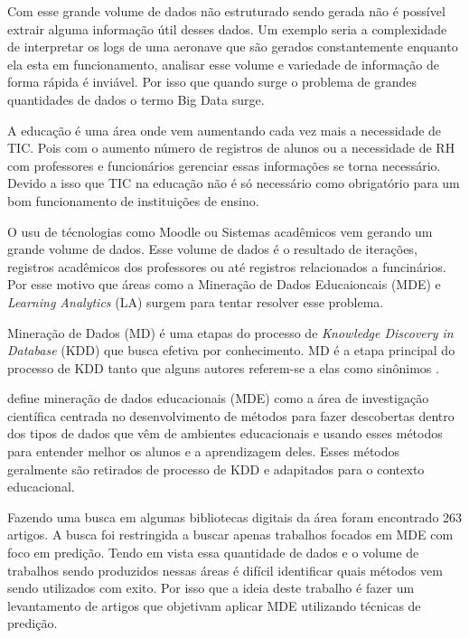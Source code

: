 \documentclass[diss-proposta,nocipinfo]{texufpel}
\begin{document}
Com esse grande volume de dados não estruturado sendo gerada não é possível extrair alguma informação útil desses dados.
Um exemplo seria a complexidade de interpretar os logs de uma aeronave que são gerados constantemente enquanto ela esta em funcionamento, analisar esse volume e variedade de informação de forma rápida é inviável.
Por isso que quando surge o problema de grandes quantidades de dados o termo Big Data surge.

A educação é uma área onde vem aumentando cada vez mais a necessidade de TIC.
Pois com o aumento número de registros de alunos ou a necessidade de RH com professores e funcionários gerenciar essas informações se torna necessário.
Devido a isso que TIC na educação não é só necessário como obrigatório para um bom funcionamento de instituições de ensino.

O usu de técnologias como Moodle ou Sistemas acadêmicos vem gerando um grande volume de dados.
Esse volume de dados é o resultado de iterações, registros acadêmicos dos professores ou até registros relacionados a funcinários.
Por esse motivo que áreas como a Mineração de Dados Educaioncais (MDE) e \textit{Learning Analytics} (LA) surgem para tentar resolver esse problema.

Mineração de Dados (MD) é uma etapas do processo de \textit{Knowledge Discovery in Database} (KDD) que busca efetiva por conhecimento. MD é a etapa principal do processo de KDD tanto que alguns autores referem-se a elas como sinônimos \cite{goldschmidt2015data}.

\citet{baker2010data} define mineração de dados educacionais (MDE) como a área de investigação científica centrada no desenvolvimento de métodos para fazer descobertas dentro dos tipos de dados que vêm de ambientes educacionais e usando esses métodos para entender melhor os alunos e a aprendizagem deles. Esses métodos geralmente são retirados de processo de KDD e adapitados para o contexto educacional.

Fazendo uma busca em algumas bibliotecas digitais da área foram encontrado 263 artigos. A busca foi restringida a buscar apenas trabalhos focados em MDE com foco em predição. Tendo em vista essa quantidade de dados e o volume de trabalhos sendo produzidos nessas áreas é difícil identificar quais métodos vem sendo utilizados com exito. Por isso que a ideia deste trabalho é fazer um levantamento de artigos que objetivam aplicar MDE utilizando técnicas de predição.
\end{document}
